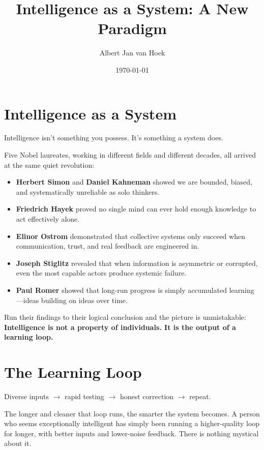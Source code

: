 \documentclass{article}
\title{Intelligence as a System: A New Paradigm}
\author{Albert Jan van Hoek}
\date{\today}
\begin{document}
\maketitle

\section*{Intelligence as a System}

Intelligence isn't something you possess. It's something a system does.

Five Nobel laureates, working in different fields and different decades, all arrived at the same quiet revolution:

\begin{itemize}
    \item \textbf{Herbert Simon} and \textbf{Daniel Kahneman} showed we are bounded, biased, and systematically unreliable as solo thinkers.
    \item \textbf{Friedrich Hayek} proved no single mind can ever hold enough knowledge to act effectively alone.
    \item \textbf{Elinor Ostrom} demonstrated that collective systems only succeed when communication, trust, and real feedback are engineered in.
    \item \textbf{Joseph Stiglitz} revealed that when information is asymmetric or corrupted, even the most capable actors produce systemic failure.
    \item \textbf{Paul Romer} showed that long-run progress is simply accumulated learning—ideas building on ideas over time.
\end{itemize}

Run their findings to their logical conclusion and the picture is unmistakable: \textbf{Intelligence is not a property of individuals. It is the output of a learning loop.}

\section*{The Learning Loop}

Diverse inputs $\rightarrow$ rapid testing $\rightarrow$ honest correction $\rightarrow$ repeat.

The longer and cleaner that loop runs, the smarter the system becomes. A person who seems exceptionally intelligent has simply been running a higher-quality loop for longer, with better inputs and lower-noise feedback. There is nothing mystical about it.
\end{document}
